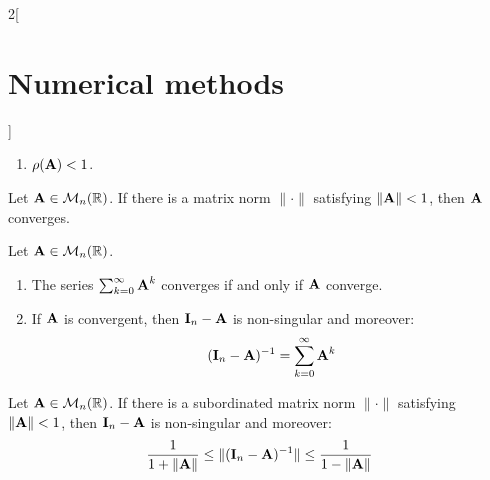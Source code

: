 \documentclass[../../../main.tex]{subfiles}
\begin{document}
\begin{multicols}{2}[\section{Numerical methods}]
\begin{theorem}
\begin{enumerate}
      \item $\rho(\boldsymbol{\mathrm{A}})<1$.
    \end{enumerate}
  \end{theorem}
  \begin{corollary}
    Let $\boldsymbol{\mathrm{A}}\in\mathcal{M}_n(\mathbb{R})$. If there is a matrix norm $\|\cdot\|$ satisfying $\|\boldsymbol{\mathrm{A}}\|<1$, then $\boldsymbol{\mathrm{A}}$ converges.
  \end{corollary}
  \begin{theorem}
    Let $\boldsymbol{\mathrm{A}}\in\mathcal{M}_n(\mathbb{R})$.
    \begin{enumerate}
      \item The series $\sum_{k=0}^\infty \boldsymbol{\mathrm{A}}^k$ converges if and only if $\boldsymbol{\mathrm{A}}$ converge.
      \item If $\boldsymbol{\mathrm{A}}$ is convergent, then $\boldsymbol{\mathrm{I}}_n-\boldsymbol{\mathrm{A}}$ is non-singular and moreover: $$(\boldsymbol{\mathrm{I}}_n-\boldsymbol{\mathrm{A}})^{-1}=\sum_{k=0}^\infty\boldsymbol{\mathrm{A}}^k$$
    \end{enumerate}
  \end{theorem}
  \begin{corollary}
    Let $\boldsymbol{\mathrm{A}}\in\mathcal{M}_n(\mathbb{R})$. If there is a subordinated matrix norm $\|\cdot\|$ satisfying $\|\boldsymbol{\mathrm{A}}\|<1$, then $\boldsymbol{\mathrm{I}}_n-\boldsymbol{\mathrm{A}}$ is non-singular and moreover: $$\frac{1}{1+\|\boldsymbol{\mathrm{A}}\|}\leq\|(\boldsymbol{\mathrm{I}}_n-\boldsymbol{\mathrm{A}})^{-1}\|\leq\frac{1}{1-\|\boldsymbol{\mathrm{A}}\|}$$
  \end{corollary}

\end{multicols}
\end{document}

